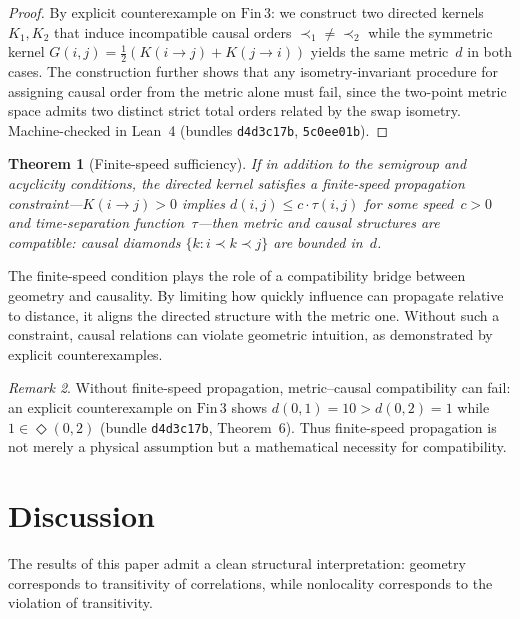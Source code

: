 \documentclass[11pt,a4paper]{article}
\newtheorem{theorem}{Theorem}[section]
\theoremstyle{definition}
\theoremstyle{remark}
\newtheorem{remark}[theorem]{Remark}
\begin{document}
\begin{proof}
By explicit counterexample on $\mathrm{Fin}\,3$: we construct two directed kernels $K_1, K_2$ that induce incompatible causal orders $\prec_1 \ne \prec_2$ while the symmetric kernel $G(i,j) = \frac{1}{2}(K(i\to j) + K(j\to i))$ yields the same metric~$d$ in both cases. The construction further shows that any isometry-invariant procedure for assigning causal order from the metric alone must fail, since the two-point metric space admits two distinct strict total orders related by the swap isometry. Machine-checked in Lean~4 (bundles \texttt{d4d3c17b}, \texttt{5c0ee01b}).
\end{proof}

\begin{theorem}[Finite-speed sufficiency]\label{thm:finite-speed}
If in addition to the semigroup and acyclicity conditions, the directed kernel satisfies a finite-speed propagation constraint---$K(i \to j) > 0$ implies $d(i,j) \le c \cdot \tau(i,j)$ for some speed~$c > 0$ and time-separation function~$\tau$---then metric and causal structures are compatible: causal diamonds $\{k : i \prec k \prec j\}$ are bounded in~$d$.
\end{theorem}

The finite-speed condition plays the role of a compatibility bridge between geometry and causality. By limiting how quickly influence can propagate relative to distance, it aligns the directed structure with the metric one. Without such a constraint, causal relations can violate geometric intuition, as demonstrated by explicit counterexamples.

\begin{remark}
Without finite-speed propagation, metric--causal compatibility can fail: an explicit counterexample on $\mathrm{Fin}\,3$ shows $d(0,1) = 10 > d(0,2) = 1$ while $1 \in \Diamond(0,2)$ (bundle \texttt{d4d3c17b}, Theorem~6). Thus finite-speed propagation is not merely a physical assumption but a mathematical necessity for compatibility.
\end{remark}


\section{Discussion}\label{sec:discussion}

The results of this paper admit a clean structural interpretation: geometry corresponds to transitivity of correlations, while nonlocality corresponds to the violation of transitivity.
\end{document}
